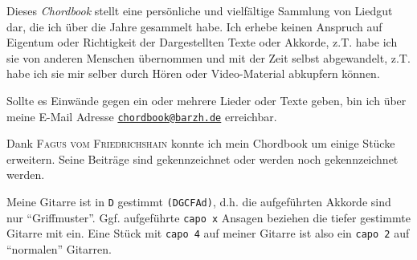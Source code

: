 
\begin{center}
    { \large
        \begin{minipage}[h]{0.7\textwidth}
            \begin{tcolorbox}[colback=red!7,colframe=red!70!black,fonttitle=\bfseries,title=Disclaimer]
                Dieses \textit{Chordbook} stellt eine pers\"{o}nliche und vielf\"{a}ltige Sammlung von Liedgut dar, die ich \"{u}ber die Jahre gesammelt habe.
                Ich erhebe keinen Anspruch auf Eigentum oder Richtigkeit der Dargestellten Texte oder Akkorde, z.T. habe ich sie von anderen Menschen \"{u}bernommen und mit der Zeit selbst abgewandelt, z.T. habe ich sie mir selber durch H\"{o}ren oder Video-Material abkupfern k\"{o}nnen. \par\medskip

                Sollte es Einw\"{a}nde gegen ein oder mehrere Lieder oder Texte geben, bin ich \"{u}ber meine E-Mail Adresse \href{mailto:chordbook@barzh.de}{\texttt{chordbook@barzh.de}} erreichbar. \par\medskip

                Dank \textsc{Fagus vom Friedrichshain} konnte ich mein Chordbook um einige St\"{u}cke erweitern.
                Seine Beitr\"{a}ge sind gekennzeichnet oder werden noch gekennzeichnet werden.
            \end{tcolorbox}
        \end{minipage}
    }

            \vfill

    { \large
        \begin{minipage}[h]{0.7\textwidth}
            \begin{tcolorbox}[colback=red!7,colframe=red!70!black,fonttitle=\bfseries,title=Stimmung der Gitarre]
                Meine Gitarre ist in \texttt{D} gestimmt \texttt{(DGCFAd)}, d.h. die aufgeführten Akkorde sind nur "`Griffmuster"'.
                Ggf. aufgeführte \texttt{capo x} Ansagen beziehen die tiefer gestimmte Gitarre mit ein.
                Eine Stück mit \texttt{capo 4} auf meiner Gitarre ist also ein \texttt{capo 2} auf "`normalen"' Gitarren.
            \end{tcolorbox}
        \end{minipage}
    }
\end{center}
